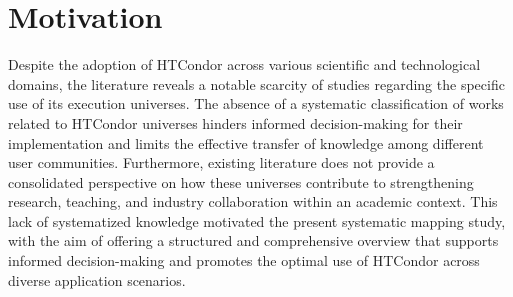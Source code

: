 \section{Motivation} \label{sec:motivacion}
Despite the adoption of HTCondor across various scientific and technological domains, the literature reveals a notable scarcity of studies regarding the specific use of its execution universes.
The absence of a systematic classification of works related to HTCondor universes hinders informed decision-making for their implementation and limits the effective transfer of knowledge among different user communities. Furthermore, existing literature does not provide a consolidated perspective on how these universes contribute to strengthening research, teaching, and industry collaboration within an academic context.
This lack of systematized knowledge motivated the present systematic mapping study, with the aim of offering a structured and comprehensive overview that supports informed decision-making and promotes the optimal use of HTCondor across diverse application scenarios.
